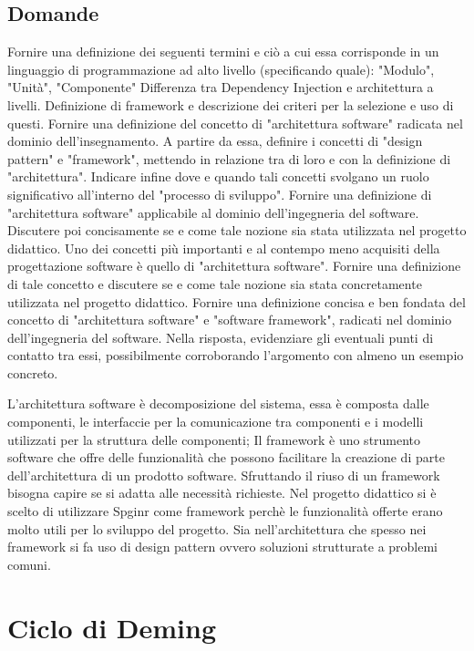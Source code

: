 \subsection*{Domande}
Fornire una definizione dei seguenti termini e ciò a cui essa corrisponde in un linguaggio di programmazione ad alto livello (specificando quale): "Modulo", "Unità", "Componente"
Differenza tra Dependency Injection e architettura a livelli.
Definizione di framework e descrizione dei criteri per la selezione e uso di questi.
Fornire una definizione del concetto di "architettura software" radicata nel dominio dell'insegnamento. A partire da essa, definire i concetti di "design pattern" e "framework", mettendo in relazione tra di loro e con la definizione di "architettura".  Indicare infine dove e quando tali concetti svolgano un ruolo significativo all'interno del "processo di sviluppo".
Fornire una definizione di "architettura software" applicabile al dominio dell'ingegneria del software. Discutere poi concisamente se e come tale nozione sia stata utilizzata nel progetto didattico.
Uno dei concetti più importanti e al contempo meno acquisiti della progettazione software è quello di "architettura software". Fornire una definizione di tale concetto e discutere se e come tale nozione sia stata concretamente utilizzata nel progetto didattico.
Fornire una definizione concisa e ben fondata del concetto di "architettura software" e "software framework", radicati nel dominio dell'ingegneria del software. Nella risposta, evidenziare gli eventuali punti di contatto tra essi, possibilmente corroborando l'argomento con almeno un esempio concreto.

L'architettura software è decomposizione del sistema, essa è composta dalle componenti, le interfaccie per la
comunicazione tra componenti e i modelli utilizzati per la struttura delle componenti;
Il framework è uno strumento software che offre delle funzionalità che possono facilitare la creazione di parte
dell'architettura di un prodotto software.
Sfruttando il riuso di un framework bisogna capire se si adatta alle necessità richieste. Nel progetto didattico si è scelto
di utilizzare Spginr come framework perchè le funzionalità offerte erano molto utili per lo sviluppo del progetto.
Sia nell'architettura che spesso nei framework si fa uso di design pattern ovvero soluzioni strutturate a problemi comuni.

\section{Ciclo di Deming}

